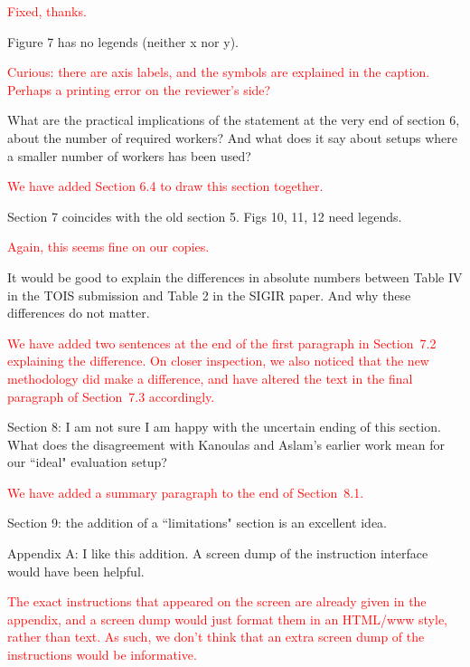 \documentclass[a4paper]{article}
\newcommand{\comment}[1]{\vspace{1em} \textcolor{red}{{#1}} \vspace{1em}}
\begin{document}
\comment {Fixed, thanks.}

Figure 7 has no legends (neither x nor y).

\comment {Curious: there are axis labels, and the symbols are explained
in the caption. Perhaps a printing error on the reviewer's side?} 

What are the practical implications of the statement at the very
end of section 6, about the number of required workers? And what
does it say about setups where a smaller number of workers has been
used?

\comment {We have added Section 6.4 to draw this section together.}

Section 7 coincides with the old section 5. 
Figs 10, 11, 12 need legends. 

\comment {Again, this seems fine on our copies.}

It would be good to explain the differences in absolute
numbers between Table IV in the TOIS submission and Table 2 in the
SIGIR paper. And why these differences do not matter.

\comment {We have added two sentences at the end of the first paragraph in Section~7.2 
explaining the difference. On closer inspection, we also noticed that the new methodology did make a
difference, and have altered the text in the final paragraph of Section~7.3 accordingly.}

Section 8: I am not sure I am happy with the uncertain ending of
this section. What does the disagreement with Kanoulas and Aslam's
earlier work mean for our ``ideal" evaluation setup?

\comment{We have added a summary paragraph to the end of Section~8.1.}

Section 9: the addition of a ``limitations" section is an excellent
idea.

Appendix A: I like this addition. A screen dump of the instruction
interface would have been helpful.

\comment{The exact instructions that appeared on the screen are already
given in the appendix, and a screen dump would just format them in an
HTML/www style, rather than text.
As such, we don't think that an extra screen dump of the instructions
would be informative.
} 
\end{document}
